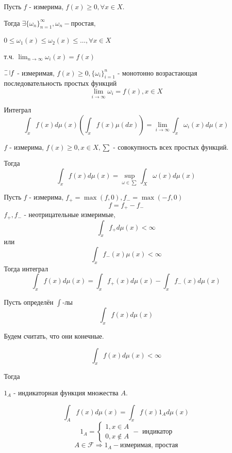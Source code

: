 \begin{definition}[Утверждение]
	Пусть $f$ - измерима, $f(x) \ge 0, \forall x \in X$.
	
	\noindent Тогда $\exists \{ \omega_n \}_{n=1}^{\infty}, \omega_n - \text{простая}$,
	
	\noindent $0 \le \omega_1(x) \le \omega_2(x) \le \dots , \forall x \in X$
	
	\noindent т.ч. $\lim_{n \to \infty} \omega_i(x) = f(x)$
\end{definition}

\begin{definition}
	$\letus f$ - измеримая, $f(x) \ge 0, \{ \omega_i \}_{i=1}^n$ - монотонно возрастающая последовательность простых функций
	\[ \lim_{i \to \infty} \omega_i = f(x), x \in X \]
	
	Интеграл
	\[ \int_{x} f(x) d \mu (x) \left( \int_{x} f(x) \mu (dx) \right) = \lim_{i \to \infty} \int_{x} \omega_i (x) d \mu (x) \]
\end{definition}

\begin{definition}
	$f$ - измерима, $f(x) \ge 0, x \in X, \sum$ - совокупность всех простых функций.
	
	Тогда 
	\[ \int_{x} f(x) d \mu(x) = \sup_{\omega \in \sum} \int_{X} \omega(x) d \mu (x) \]
\end{definition}

\begin{definition}
	Пусть $f$ - измерима, $f_+ = \max (f, 0), f_- = \max (-f, 0)$
	\[ f = f_+ - f_- \]
	$f_+, f_-$ - неотрицательные измеримые,
	\[ \int_{x} f_+ d \mu (x) < \infty \]
	или
	\[ \int_{x} f_-(x) \mu (x) < \infty \]
	Тогда интеграл 
	\[ \int_{x} f(x) d \mu(x) = \int_x f_+(x) d \mu (x) - \int_{x} f_- (x) d \mu (x) \]
\end{definition}

\noindent Пусть определён $\int$-лы
\[ \int_{x} f(x) d \mu (x) \]

\noindent Будем считать, что они конечные.

\[ \int_{x} f(x) d \mu (x) < \infty \]

\noindent Тогда

\begin{remark}
	$1_A$ - индикаторная функция множества $A$.
\end{remark}

\[ \int_{A} f(x) d \mu (x) = \int_{x} f(x) 1_A d \mu (x) \]
\[ 1_A = 
\begin{cases}
	1, x \in A \\
	0, x \notin A
\end{cases}
- \text{ индикатор}
\]
\[ A \in \mathcal{F} \Rightarrow 1_A - \text{измеримая, простая} \]


